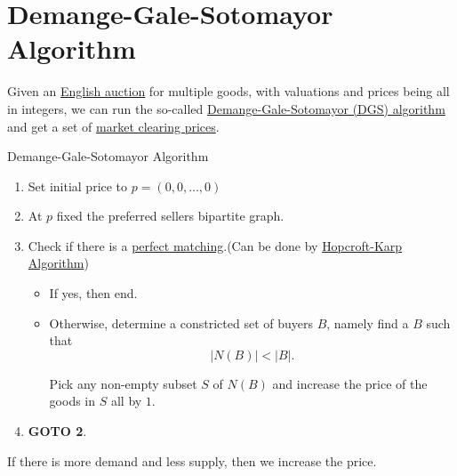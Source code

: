 \section{Demange-Gale-Sotomayor Algorithm}
Given an \hyperref[eg:English-auction]{English auction} for multiple goods, with valuations and prices being all in integers, we can run the
so-called \hyperref[algo:Demange-Gale-Sotomayor-algorithm]{Demange-Gale-Sotomayor (DGS) algorithm} and get a set of
\hyperref[note:market-clearing-prices]{market clearing prices}.

\par{}
\begin{algorithm}[H]\label{algo:Demange-Gale-Sotomayor-algorithm}
	\DontPrintSemicolon
	\caption{Demange-Gale-Sotomayor Algorithm}
	\KwData{}
	\KwResult{}
	\BlankLine

\end{algorithm}

\begin{enumerate}
	\item Set initial price to \(p = (0, 0, \ldots , 0 )\)
	\item At \(p\) fixed the preferred sellers bipartite graph.
	\item Check if there is a \hyperref[def:perfect-matching]{perfect matching}.(Can be done by \hyperref[sec:Hopcroft-Karp-algorithm]{Hopcroft-Karp Algorithm})
	      \begin{itemize}
		      \item If yes, then end.
		      \item Otherwise, determine a constricted set of buyers \(B\), namely find a \(B\) such that
		            \[
			            \left\vert N(B) \right\vert < \left\vert B \right\vert.
		            \]

		            Pick any non-empty subset \(S\) of \(N(B)\) and increase the price of the goods in \(S\) all by \(1\).
	      \end{itemize}
	\item \textbf{GOTO 2}.
\end{enumerate}

\begin{intuition}
	If there is more demand and less supply, then we increase the price.
\end{intuition}

